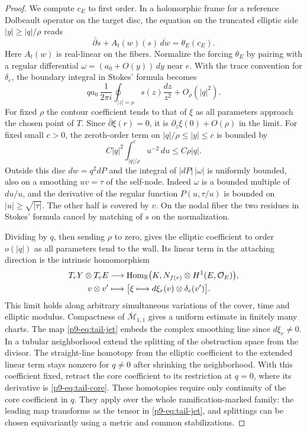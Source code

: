 \begin{proof}
We compute $c_E$ to first order. In a holomorphic frame for a reference
Dolbeault operator on the target disc, the equation on the truncated
elliptic side $|y|\geq |q|/\rho$ reads
\[
 \bar\partial s+A_t(w)(s)\,\overline{dw}=\theta_E(c_E).
\]
Here $A_t(w)$ is real-linear on the fibers. Normalize the forcing
$\theta_E$ by pairing with a regular differential
$\omega=(a_0+O(y))\,dy$ near $e$. With the trace convention for
$\delta_e$, the boundary integral in Stokes' formula becomes
\[
 q a_0\,\frac{1}{2\pi i}\oint_{|z|=\rho}s(z)\frac{dz}{z^2}
       + O_\rho(|q|^2).
\]
For fixed $\rho$ the contour coefficient tends to that of $\xi$ as all
parameters approach the chosen point of $T$. Since $\bar\partial\xi(r)=0$,
it is $\partial_z\xi(0)+O(\rho)$ in the limit. For fixed small $c>0$,
the zeroth-order term on $|q|/\rho\leq |y|\leq c$ is bounded by
\[
 C|q|^2\int_{|q|/\rho}^c u^{-2}\,du\leq C\rho |q|.
\]
Outside this disc $dw=q^2dP$ and the integral of $|dP|\,|\omega|$ is
uniformly bounded, also on a smoothing $uv=\tau$ of the self-node.
Indeed $\omega$ is a bounded multiple of $du/u$, and the derivative
of the regular function $P(u,\tau/u)$ is bounded on $|u|\geq
\sqrt{|\tau|}$. The other half is covered by $v$. On the nodal fiber the two
residues in Stokes' formula cancel by matching of $s$ on the normalization.

Dividing by $q$, then sending $\rho$ to zero, gives the elliptic
coefficient to order $o(|q|)$ as all parameters tend to the wall. Its
linear term in the attaching direction is the intrinsic homomorphism
\begin{equation}\label{p9-eq:tail-jet}
 \begin{aligned}
 T_rY\otimes T_eE &\longrightarrow
 \operatorname{Hom}_{\mathbb R}\bigl(K,N_{f(r)}\otimes H^1(E,\mathcal O_E)\bigr),\\
 v\otimes v'&\longmapsto
 \bigl[\xi\longmapsto d\xi_r(v)\otimes\delta_e(v')\bigr].
 \end{aligned}
\end{equation}
This limit holds along arbitrary simultaneous variations of the cover,
time and elliptic modulus. Compactness of $\overline{\mathcal M}_{1,1}$
gives a uniform estimate in finitely many charts. The map
\eqref{p9-eq:tail-jet} embeds the complex smoothing line since $d\xi_r\ne0$.
In a tubular neighborhood extend the splitting of the obstruction space
from the divisor. The straight-line homotopy from the elliptic
coefficient to the extended linear term stays nonzero for $q\ne0$
after shrinking the neighborhood. With this coefficient fixed, retract
the core coefficient to its restriction at $q=0$, where its derivative
is \eqref{p9-eq:tail-core}. These homotopies require only continuity of the
core coefficient in $q$. They apply over the whole ramification-marked
family: the leading map transforms as the tensor in \eqref{p9-eq:tail-jet},
and splittings can be chosen equivariantly using a metric and common
stabilizations.


\end{proof}
